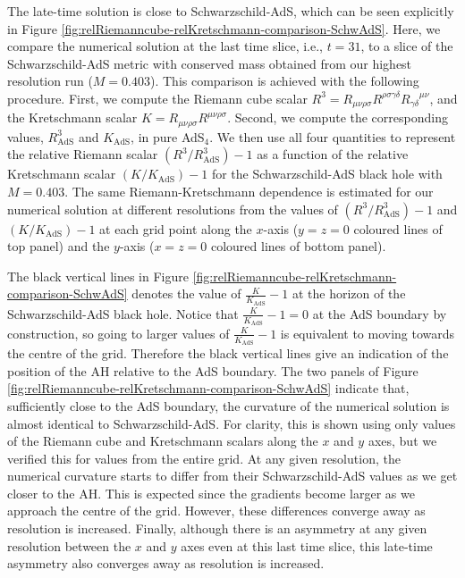 \documentclass[a4paper,11pt]{article}
\numberwithin{equation}{section}
\begin{document}
The late-time solution is close to Schwarzschild-AdS, which can be seen explicitly in Figure \ref{fig:relRiemanncube-relKretschmann-comparison-SchwAdS}.
Here, we compare the numerical solution at the last time slice, i.e., $t=31$, to a slice of the Schwarzschild-AdS metric with conserved mass obtained from our highest resolution run ($M=0.403$).
This comparison is achieved with the following procedure.
First, we compute the Riemann cube scalar $R^3=R_{\mu\nu\rho\sigma}R^{\rho\sigma\gamma\delta}{R_{\gamma\delta}}^{\mu\nu}$, and the Kretschmann scalar $K=R_{\mu\nu\rho\sigma}R^{\mu\nu\rho\sigma}$.
Second, we compute the corresponding values, $R^3_{\text{AdS}}$ and $K_{\text{AdS}}$, in pure AdS$_4$.
We then use all four quantities to represent the relative Riemann scalar $(R^3/R^3_{\text{AdS}})-1$ as a function of the relative Kretschmann scalar $(K/K_{\text{AdS}})-1$ for the Schwarzschild-AdS black hole with $M=0.403$.
The same Riemann-Kretschmann dependence is estimated for our numerical solution at different resolutions from the values of $(R^3/R^3_{\text{AdS}})-1$ and $(K/K_{\text{AdS}})-1$ at each grid point along the $x$-axis ($y=z=0$ coloured lines of top panel) and the $y$-axis ($x=z=0$ coloured lines of bottom panel).

The black vertical lines in Figure \ref{fig:relRiemanncube-relKretschmann-comparison-SchwAdS} denotes the value of $\frac{K}{K_{\text{AdS}}}-1$ at the horizon of  the Schwarzschild-AdS black hole. 
Notice that $\frac{K}{K_{\text{AdS}}}-1=0$ at the AdS boundary by construction, so going to larger values of $\frac{K}{K_{\text{AdS}}}-1$ is equivalent to moving towards the centre of the grid.
Therefore the black vertical lines give an indication of the position of the AH relative to the AdS boundary.
The two panels of Figure \ref{fig:relRiemanncube-relKretschmann-comparison-SchwAdS} indicate that, sufficiently close to the AdS boundary, the curvature of the numerical solution is almost identical to Schwarzschild-AdS. For clarity, this is shown using only values of the Riemann cube and Kretschmann scalars along the $x$ and $y$ axes, but we verified this for values from the entire grid. 
At any given resolution, the numerical curvature starts to differ from their Schwarzschild-AdS values as we get closer to the AH. This is expected since the gradients become larger as we approach the centre of the grid.
However, these differences converge away as resolution is increased.
Finally, although there is an asymmetry at any given resolution between the $x$ and $y$ axes even at this last time slice, this late-time asymmetry also converges away as resolution is increased.
\end{document}
